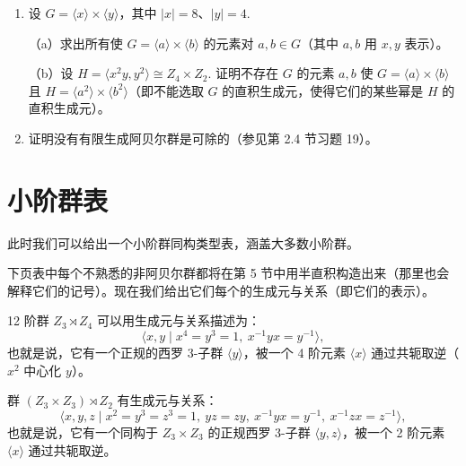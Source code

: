 \begin{enumerate}
（a）证明 \(\hat{G}\) 上的这个运算使 \(\hat{G}\) 成为阿贝尔群。〔证明单位元是对所有 \(g \in G\) 的映射 \(g \mapsto 1\)，\(\chi \in \hat{G}\) 的逆元是映射 \(g \mapsto \chi(g)^{-1}\).〕

（b）若 \(G\) 是有限阿贝尔群，证明 \(\hat{G} \cong G\).〔把 \(G\) 写成 \(\langle x_1 \rangle \times \cdots \times \langle x_r \rangle\)，若 \(n_i = |x_i|\)，定义 \(\chi_i\) 为把 \(x_i\) 映到 \(e^{2\pi i/n_i}\)、把 \(x_j\) 映到 1（对所有 \(j \neq i\)）的同态。证明 \(\chi_i\) 在 \(\hat{G}\) 中的阶为 \(n_i\)，且 \(\hat{G} = \langle \chi_1 \rangle \times \cdots \times \langle \chi_r \rangle\).〕（这个结果常说成：有限阿贝尔群是自对偶的。它蕴含有限阿贝尔群的格图上下翻转后不变。但要注意 \(G\) 与其对偶之间没有自然的同构（同构依赖于 \(G\) 的一组生成元的选取）。这常说成：有限阿贝尔群与其对偶非典范同构。）

\item 设 \(G = \langle x \rangle \times \langle y \rangle\)，其中 \(|x| = 8\)、\(|y| = 4\).

（a）求出所有使 \(G = \langle a \rangle \times \langle b \rangle\) 的元素对 \(a, b \in G\)（其中 \(a, b\) 用 \(x, y\) 表示）。

（b）设 \(H = \langle x^2 y, y^2 \rangle \cong Z_4 \times Z_2\). 证明不存在 \(G\) 的元素 \(a, b\) 使 \(G = \langle a \rangle \times \langle b \rangle\) 且 \(H = \langle a^2 \rangle \times \langle b^2 \rangle\)（即不能选取 \(G\) 的直积生成元，使得它们的某些幂是 \(H\) 的直积生成元）。

\item 证明没有有限生成阿贝尔群是可除的（参见第 2.4 节习题 19）。
\end{enumerate}

\section{小阶群表}

此时我们可以给出一个小阶群同构类型表，涵盖大多数小阶群。

下页表中每个不熟悉的非阿贝尔群都将在第 5 节中用半直积构造出来（那里也会解释它们的记号）。现在我们给出它们每个的生成元与关系（即它们的表示）。

12 阶群 \(Z_3 \rtimes Z_4\) 可以用生成元与关系描述为：
\[
\langle x, y \mid x^4 = y^3 = 1,\ x^{-1}yx = y^{-1} \rangle,
\]
也就是说，它有一个正规的西罗 3-子群 \(\langle y \rangle\)，被一个 4 阶元素 \(\langle x \rangle\) 通过共轭取逆（\(x^2\) 中心化 \(y\)）。

群 \((Z_3 \times Z_3) \rtimes Z_2\) 有生成元与关系：
\[
\langle x, y, z \mid x^2 = y^3 = z^3 = 1,\ yz = zy,\ x^{-1}yx = y^{-1},\ x^{-1}zx = z^{-1} \rangle,
\]
也就是说，它有一个同构于 \(Z_3 \times Z_3\) 的正规西罗 3-子群 \(\langle y, z \rangle\)，被一个 2 阶元素 \(\langle x \rangle\) 通过共轭取逆。

